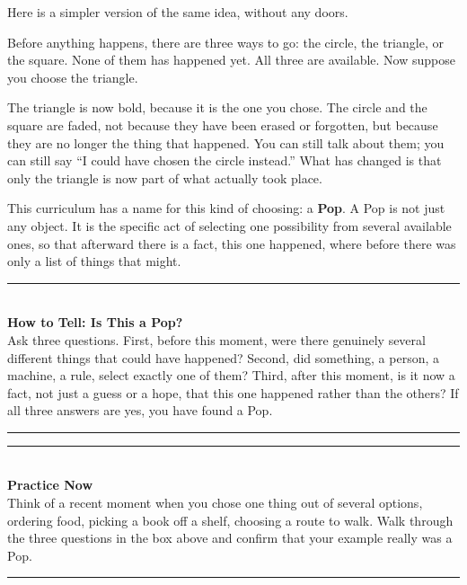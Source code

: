 \documentclass[11pt]{book}
\newenvironment{algorithmproc}[1]{%
\vspace{0.6em}\noindent\rule{\linewidth}{0.6pt}\\[0.2em]\textbf{How to Tell: #1}\\[0.3em]}%
{\\[0.2em]\noindent\rule{\linewidth}{0.6pt}\vspace{0.6em}}
\newenvironment{practicenow}{%
\vspace{0.6em}\noindent\rule{\linewidth}{0.6pt}\\[0.2em]\textbf{Practice Now}\\[0.3em]}%
{\\[0.2em]\noindent\rule{\linewidth}{0.6pt}\vspace{0.6em}}
\begin{document}
Here is a simpler version of the same idea, without any doors.

\begin{center}
\end{center}

Before anything happens, there are three ways to go: the circle, the triangle, or the square. None of them has happened yet. All three are available. Now suppose you choose the triangle.

\begin{center}
\end{center}

The triangle is now bold, because it is the one you chose. The circle and the square are faded, not because they have been erased or forgotten, but because they are no longer the thing that happened. You can still talk about them; you can still say ``I could have chosen the circle instead.'' What has changed is that only the triangle is now part of what actually took place.

This curriculum has a name for this kind of choosing: a \textbf{Pop}. A Pop is not just any object. It is the specific act of selecting one possibility from several available ones, so that afterward there is a fact, this one happened, where before there was only a list of things that might.

\begin{algorithmproc}{Is This a Pop?}
Ask three questions. First, before this moment, were there genuinely several different things that could have happened? Second, did something, a person, a machine, a rule, select exactly one of them? Third, after this moment, is it now a fact, not just a guess or a hope, that this one happened rather than the others? If all three answers are yes, you have found a Pop.
\end{algorithmproc}

\begin{practicenow}
Think of a recent moment when you chose one thing out of several options, ordering food, picking a book off a shelf, choosing a route to walk. Walk through the three questions in the box above and confirm that your example really was a Pop.
\end{practicenow}
\end{document}
